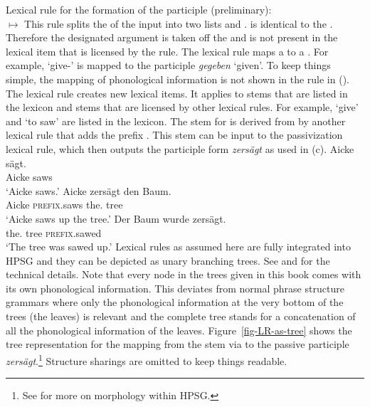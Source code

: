 \ea
\label{lr-passive-prelim}
Lexical rule for the formation of the participle (preliminary):\\
 $\mapsto$
\z
This rule splits the \argstl of the input into two lists  and .  is
identical to the \dav. Therefore the designated argument is taken off the \argstl and is not present
in the lexical item that is licensed by the rule. The lexical rule maps a  to a
. For example,  `give-' is mapped to the participle \emph{gegeben} `given'. To
keep things simple, the mapping of phonological information is not shown in the rule in
(). %
\label{page-lexical-rule-explanation-start}%
The lexical rule creates new lexical items. It applies to stems that are listed in the lexicon and
stems that are licensed by other lexical rules. For example,  `give' and  `to
saw' are listed in the lexicon. The stem for  is derived from  by another
lexical rule that adds the prefix . This stem can be input to the passivization lexical
rule, which then outputs the participle form \emph{zersägt} as used in (c).
\eal
\ex 
\gll Aicke sägt.\\
     Aicke saws\\\german
\glt `Aicke saws.'
\ex
\gll Aicke zersägt den Baum.\\
     Aicke \textsc{prefix}.saws the.\ACC{} tree\\
\glt `Aicke saws up the tree.'
\ex
\gll Der Baum wurde zersägt.\\
     the.\NOM{} tree \AUX{}   \textsc{prefix}.sawed\\
\glt `The tree was sawed up.'
\zl
Lexical rules as assumed here are fully integrated into HPSG and they can be depicted as unary
branching trees. See \citet{Meurers2000b} and \citet{BC99a} for the technical details. Note that every node in the trees given in this book comes with its own
phonological information. This deviates from normal phrase structure grammars where only the
phonological information at the very bottom of the trees (the leaves) is relevant and the complete tree stands
for a concatenation of all the phonological information of the leaves. Figure~\ref{fig-LR-as-tree}
shows the tree representation for the mapping from the stem  via  to the
passive participle \emph{zersägt}.\footnote{%
See  for more on morphology within HPSG.
} Structure sharings are omitted to keep things readable.

